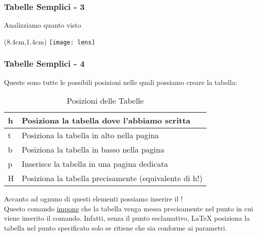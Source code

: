 \begin{frame}[fragile]
  \frametitle{Tabelle Semplici - 3}
  
  Analizziamo quanto visto
  \vspace{1em}
  
  \begin{textblock*}{5cm}(8.4cm,1.4cm)
   \texttt{[image: lens]}
  \end{textblock*}

\end{frame}


\begin{frame}
  \frametitle{Tabelle Semplici - 4}
  Queste sono tutte le possibili posizioni nelle quali possiamo creare la tabella:
  
\begin{table}[h!]
\centering
\begin{tabular}{l|l}
\hline
h      & Posiziona la tabella dove l'abbiamo scritta \\ \hline
t        & Posiziona la tabella in alto nella pagina \\ \hline
b    & Posiziona la tabella in basso nella pagina \\ \hline
p         & Inserisce la tabella in una pagina dedicata  \\ \hline
H  & Posiziona la tabella precisamente (equivalente di h!) \\ \hline
\end{tabular}
\caption{Posizioni delle Tabelle}
\end{table}
Accanto ad ognuno di questi elementi possiamo inserire il !\\
Questo comando \underline{impone} che la tabella venga messa precisamente nel punto in cui viene inserito il comando. Infatti, senza il punto esclamativo, \LaTeX{} posiziona la tabella nel punto specificato solo se ritiene che sia conforme ai parametri.
\end{frame}

